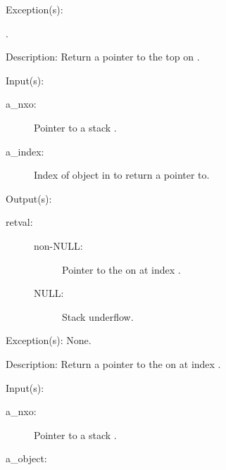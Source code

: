 \begin{capi}
\begin{capilist}
	\item[Exception(s): ]
		\begin{description}\item[]
		\item[.]
		\end{description}
	\item[Description: ]
		Return a pointer to the top  on .
	\end{capilist}
\label{nxo_stack_nget}
	\begin{capilist}
	\item[Input(s): ]
		\begin{description}\item[]
		\item[a\_nxo: ]
			Pointer to a stack .
		\item[a\_index: ]
			Index of object in  to return a pointer to.
		\end{description}
	\item[Output(s): ]
		\begin{description}\item[]
		\item[retval: ]
			\begin{description}\item[]
			\item[non-NULL: ]
				Pointer to the  on  at
				index .
			\item[NULL: ]
				Stack underflow.
			\end{description}
		\end{description}
	\item[Exception(s): ] None.
	\item[Description: ]
		Return a pointer to the  on  at index
		.
	\end{capilist}
\label{nxo_stack_down_get}
	\begin{capilist}
	\item[Input(s): ]
		\begin{description}\item[]
		\item[a\_nxo: ]
			Pointer to a stack \classname{nxo}.
		\item[a\_object: ]

\end{description}
\end{capilist}
\end{capi}
